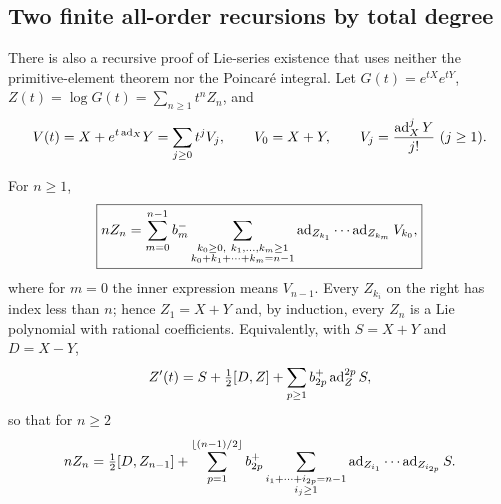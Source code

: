 \subsection{Two finite all-order recursions by total degree}\label{sec:homrec}
There is also a recursive proof of Lie-series existence that uses neither
the primitive-element theorem nor the Poincar\'e integral. Let
$G(t)=e^{tX}e^{tY}$, $Z(t)=\log G(t)=\sum_{n\geq1}t^nZ_n$, and
\begin{equation}\label{eq:Vj}
 V(t)=X+e^{t\operatorname{ad}_X}Y=\sum_{j\geq0}t^jV_j,\qquad
 V_0=X+Y,\qquad V_j=\frac{\operatorname{ad}_X^jY}{j!}\ (j\geq1).
\end{equation}
\begin{theorem}\label{thm:homrec}
For $n\geq1$,
\begin{equation}\label{eq:homrec}
 \boxed{\displaystyle
 nZ_n=\sum_{m=0}^{n-1}b^{-}_{m}
 \sum_{\substack{k_0\geq0,\ k_1,\ldots,k_m\geq1\\
                   k_0+k_1+\cdots+k_m=n-1}}
 \operatorname{ad}_{Z_{k_1}}\cdots\operatorname{ad}_{Z_{k_m}}V_{k_0},}
\end{equation}
where for $m=0$ the inner expression means $V_{n-1}$. Every $Z_{k_i}$ on
the right has index less than $n$; hence $Z_1=X+Y$ and, by induction, every
$Z_n$ is a Lie polynomial with rational coefficients. Equivalently, with
$S=X+Y$ and $D=X-Y$,
\begin{equation}\label{eq:compactode}
 Z'(t)=S+\tfrac12[D,Z]+\sum_{p\geq1}b^{+}_{2p}\operatorname{ad}_Z^{2p}S,
\end{equation}
so that for $n\geq2$
\begin{equation}\label{eq:compactrec}
 nZ_n=\tfrac12[D,Z_{n-1}]
 +\sum_{p=1}^{\lfloor(n-1)/2\rfloor}b^{+}_{2p}
 \sum_{\substack{i_1+\cdots+i_{2p}=n-1\\i_j\geq1}}
 \operatorname{ad}_{Z_{i_1}}\cdots\operatorname{ad}_{Z_{i_{2p}}}S.
\end{equation}
\end{theorem}
